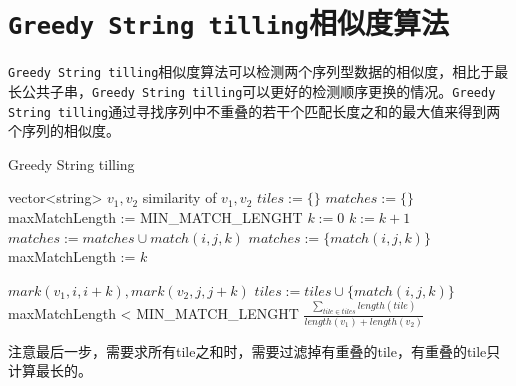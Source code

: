 \documentclass[UTF8]{ctexart}
\begin{document}
\section{\texttt{Greedy String tilling}相似度算法}
\texttt{Greedy String tilling}相似度算法可以检测两个序列型数据的相似度，相比于最长公共子串，\texttt{Greedy String tilling}可以更好的检测顺序更换的情况。\texttt{Greedy String tilling}通过寻找序列中不重叠的若干个匹配长度之和的最大值来得到两个序列的相似度。
\begin{algorithm}[H]
    \caption{Greedy String tilling}
    \begin{algorithmic}[1]
        \REQUIRE vector<string> $v_1,v_2$
        \ENSURE similarity of $v_1,v_2$
        \STATE $tiles := \{\}$
        \REPEAT 
            \STATE $matches := \{\}$
           \STATE maxMatchLength := MIN\_MATCH\_LENGHT
                    \STATE $k := 0$
                        \STATE $k:=k+1$
                    \ENDWHILE
                        \STATE $matches := matches \cup match(i,j,k) $
                    \ELSE
                        \STATE $matches := \{match(i,j,k)\}$
                        \STATE maxMatchLength := $k$
                    \ENDIF
                \ENDFOR
           \ENDFOR
           
                \STATE $mark(v_1, i, i+k),mark(v_2, j,j+k)$
                \STATE $tiles := tiles \cup \{match(i,j,k)\}$
           \ENDFOR
        \UNTIL maxMatchLength < MIN\_MATCH\_LENGHT
        \RETURN $\frac{\sum_{tile\in tiles}length(tile)}{length(v_1) + length(v_2)}$
    \end{algorithmic}
\end{algorithm}
注意最后一步，需要求所有tile之和时，需要过滤掉有重叠的tile，有重叠的tile只计算最长的。
\end{document}
